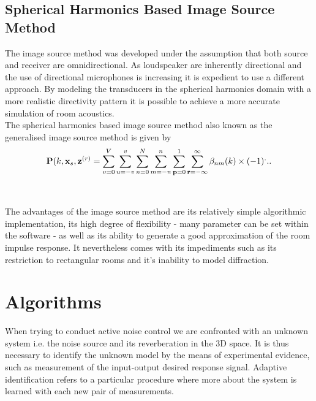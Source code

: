 \subsection{Spherical Harmonics Based Image Source Method}
The image source method was developed under the assumption that both source and receiver are omnidirectional. As loudspeaker are inherently directional and the use of directional microphones is increasing it is expedient to use a different approach. By modeling the transducers in the spherical harmonics domain with a more realistic directivity pattern it is possible to achieve a more accurate simulation of room acoustics.\cite{Samarasinghe2018}\\
The spherical harmonics based image source method also known as the generalised image source method is given by
\begin{equation}
    \mathbf{P}(k,\mathbf{x}_s,\mathbf{z}^{(r)} = \sum_{v=0}^V\sum_{u=-v}^v\sum_{n=0}^N\sum_{m=-n}^n\sum_{\mathbf{p}=0}^1\sum_{\mathbf{r}=-\infty}^\infty\beta_{nm}(k)\\
    \times (-1)^...
\end{equation}
\\
\\The advantages of the image source method are its relatively simple algorithmic implementation, its high degree of flexibility - many parameter can be set within the software - as well as its ability to generate a good approximation of the room impulse response. It nevertheless comes with its impediments such as its restriction to rectangular rooms and it's inability to model diffraction.\cite{Samarasinghe2018}


\section{Algorithms}
When trying to conduct active noise control we are confronted with an unknown system i.e. the noise source and its reverberation in the 3D space. It is thus necessary to identify the unknown model by the means of experimental evidence, such as measurement of the input-output desired response signal. Adaptive identification refers to a particular procedure where more about the system is learned with each new pair of measurements.\cite{Glentis1999}
